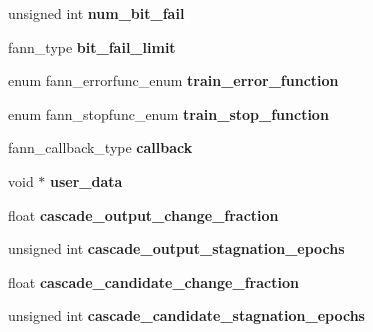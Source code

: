 \begin{DoxyCompactItemize}
\item 
\hypertarget{structfann_a0db3f02003e3e8ad7f608894b4848764}{unsigned int {\bfseries num\-\_\-bit\-\_\-fail}}\label{structfann_a0db3f02003e3e8ad7f608894b4848764}

\item 
\hypertarget{structfann_a9aa04eadd7d7d0f8a17c5c3fa24e73aa}{fann\-\_\-type {\bfseries bit\-\_\-fail\-\_\-limit}}\label{structfann_a9aa04eadd7d7d0f8a17c5c3fa24e73aa}

\item 
\hypertarget{structfann_a5d6959a6d129f5cc6e86fbe96ecdb252}{enum fann\-\_\-errorfunc\-\_\-enum {\bfseries train\-\_\-error\-\_\-function}}\label{structfann_a5d6959a6d129f5cc6e86fbe96ecdb252}

\item 
\hypertarget{structfann_acd1c3f5eafcc91dfbec3da8e7fb0efb0}{enum fann\-\_\-stopfunc\-\_\-enum {\bfseries train\-\_\-stop\-\_\-function}}\label{structfann_acd1c3f5eafcc91dfbec3da8e7fb0efb0}

\item 
\hypertarget{structfann_a2e25039beb1c0fa46a3273bc11e9d958}{fann\-\_\-callback\-\_\-type {\bfseries callback}}\label{structfann_a2e25039beb1c0fa46a3273bc11e9d958}

\item 
\hypertarget{structfann_a0f53d287ac7c064d1a49d4bd93ca1cb9}{void $\ast$ {\bfseries user\-\_\-data}}\label{structfann_a0f53d287ac7c064d1a49d4bd93ca1cb9}

\item 
\hypertarget{structfann_a08d776855199fcde9e6bc94dcea29bd8}{float {\bfseries cascade\-\_\-output\-\_\-change\-\_\-fraction}}\label{structfann_a08d776855199fcde9e6bc94dcea29bd8}

\item 
\hypertarget{structfann_a8c7c170480ea57470e03374dd95e34b6}{unsigned int {\bfseries cascade\-\_\-output\-\_\-stagnation\-\_\-epochs}}\label{structfann_a8c7c170480ea57470e03374dd95e34b6}

\item 
\hypertarget{structfann_aa3ba0cdf5917f1c3badab4b08180bba2}{float {\bfseries cascade\-\_\-candidate\-\_\-change\-\_\-fraction}}\label{structfann_aa3ba0cdf5917f1c3badab4b08180bba2}

\item 
\hypertarget{structfann_a82f83f2bba6b241eeb4a94518b0cb417}{unsigned int {\bfseries cascade\-\_\-candidate\-\_\-stagnation\-\_\-epochs}}\label{structfann_a82f83f2bba6b241eeb4a94518b0cb417}


\end{DoxyCompactItemize}
